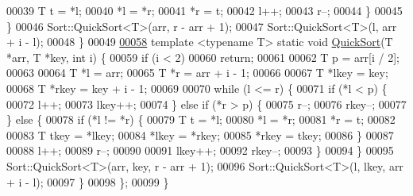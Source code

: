 \begin{DoxyCode}
00039         T t = *l;
00040         *l = *r;
00041         *r = t;
00042         l++;
00043         r--;
00044       \}
00045     \}
00046     Sort::QuickSort<T>(arr, r - arr + 1);
00047     Sort::QuickSort<T>(l, arr + i - l);
00048   \}
00049 
\hypertarget{_sort_8h_source_l00058}{}\hyperlink{class_soil_math_1_1_sort_ae30ea06713b1cff25f22498724d6f74c}{00058}   \textcolor{keyword}{template} <\textcolor{keyword}{typename} T> \textcolor{keyword}{static} \textcolor{keywordtype}{void} \hyperlink{class_soil_math_1_1_sort_ae30ea06713b1cff25f22498724d6f74c}{QuickSort}(T *arr, T *key, \textcolor{keywordtype}{int} i) \{
00059     \textcolor{keywordflow}{if} (i < 2)
00060       \textcolor{keywordflow}{return};
00061 
00062     T p = arr[i / 2];
00063 
00064     T *l = arr;
00065     T *r = arr + i - 1;
00066 
00067     T *lkey = key;
00068     T *rkey = key + i - 1;
00069 
00070     \textcolor{keywordflow}{while} (l <= r) \{
00071       \textcolor{keywordflow}{if} (*l < p) \{
00072         l++;
00073         lkey++;
00074       \} \textcolor{keywordflow}{else} \textcolor{keywordflow}{if} (*r > p) \{
00075         r--;
00076         rkey--;
00077       \} \textcolor{keywordflow}{else} \{
00078        \textcolor{keywordflow}{if} (*l != *r) \{
00079           T t = *l;
00080           *l = *r;
00081           *r = t;
00082 
00083           T tkey = *lkey;
00084           *lkey = *rkey;
00085           *rkey = tkey;
00086         \}
00087 
00088         l++;
00089         r--;
00090 
00091         lkey++;
00092         rkey--;
00093       \}
00094     \}
00095     Sort::QuickSort<T>(arr, key, r - arr + 1);
00096     Sort::QuickSort<T>(l, lkey, arr + i - l);
00097   \}
00098 \};
00099 \}
\end{DoxyCode}

